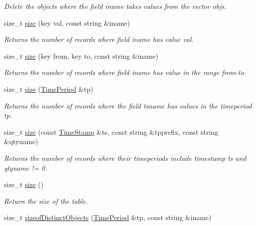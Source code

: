\begin{CompactItemize}
\begin{CompactList}\small\item\em Delete the objects where the field iname takes values from the vector objs.\item\end{CompactList}\item 
size\_\-t \hyperlink{classSQLTable_SQLTablea25}{size} (key val, const string \&iname)
\begin{CompactList}\small\item\em Returns the number of records where field iname has value val.\item\end{CompactList}\item 
size\_\-t \hyperlink{classSQLTable_SQLTablea26}{size} (key from, key to, const string \&iname)
\begin{CompactList}\small\item\em Returns the number of records where field iname has value in the range from-to.\item\end{CompactList}\item 
size\_\-t \hyperlink{classSQLTable_SQLTablea27}{size} (\hyperlink{classTimePeriod}{Time\-Period} \&tp)
\begin{CompactList}\small\item\em Returns the number of records where the field tsname has values in the timeperiod tp.\item\end{CompactList}\item 
size\_\-t \hyperlink{classSQLTable_SQLTablea28}{size} (const \hyperlink{classTimeStamp}{Time\-Stamp} \&ts, const string \&tpprefix, const string \&qtyname)
\begin{CompactList}\small\item\em Returns the number of records where their timeperiods include timestamp ts and qtyname != 0.\item\end{CompactList}\item 
size\_\-t \hyperlink{classSQLTable_SQLTablea29}{size} ()
\begin{CompactList}\small\item\em Return the size of the table.\item\end{CompactList}\item 
size\_\-t \hyperlink{classSQLTable_SQLTablea30}{sizeof\-Distinct\-Objects} (\hyperlink{classTimePeriod}{Time\-Period} \&tp, const string \&iname)

\end{CompactItemize}
